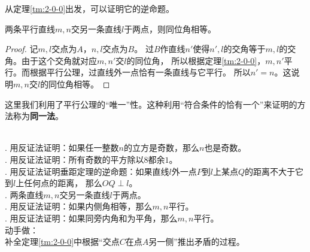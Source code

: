 \documentclass[12pt,UTF8,fontset=none]{ctexbook}
\begin{document}
从定理\ref{tm:2-0-0}出发，可以证明它的逆命题。

\begin{tm}\label{tm:2-0-10}
    两条平行直线$m,n$交另一条直线$l$于两点，则同位角相等。
\end{tm}

\begin{proof}
    记$m,l$交点为$A$，$n,l$交点为$B$。
    过$B$作直线$n'$使得$n',l$的交角等于$m,l$的交角。由于这个交角就对应$m,n'$交$l$的同位角，
    所以根据定理\ref{tm:2-0-0}，$m,n'$平行。而根据平行公理，过直线外一点恰有一条直线与它平行。
    所以$n' = n$。这说明$m,n$交$l$的同位角相等。
\end{proof}

这里我们利用了平行公理的“唯一”性。这种利用“符合条件的恰有一个”来证明的方法称为\textbf{同一法}。

\begin{xt}
    \mbox{} \\
    . 用反证法证明：如果任一整数$n$的立方是奇数，那么$n$也是奇数。\\
    . 用反证法证明：所有奇数的平方除以$8$都余$1$。\\
    . 用反证法证明垂距定理的逆命题：如果直线$l$外一点$P$到$l$上某点$Q$的距离不大于它到$l$上任何点的距离，
    那么$OQ \perp l$。\\
    . 两条直线$m,n$交另一条直线$l$于两点。\\
    . 用反证法证明：如果内侧角相等，那么$m,n$平行。\\
    . 用反证法证明：如果同旁内角和为平角，那么$m,n$平行。\\
    动手做：\\
    \indent 补全定理\ref{tm:2-0-0}中根据“交点$C$在点$A$另一侧”推出矛盾的过程。
\end{xt}
\end{document}
